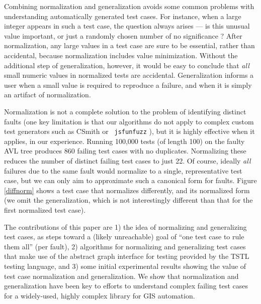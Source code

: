 Combining normalization and generalization avoids some common problems
with understanding automatically generated test cases.  For instance,
when a large integer appears in such a test case, the question always
arises --- is this unusual value important, or just a randomly chosen
number of no significance \cite{MakeMost}?  After normalization, any
large values in a test case are sure to be essential, rather than
accidental, because normalization includes value minimization.
Without the additional step of generalization, however, it would be
easy to conclude that \emph{all} small numeric values in normalized tests are
accidental.  Generalization informs a user when a small value is
required to reproduce a failure, and when it is simply an artifact of normalization.

Normalization is not a complete solution to the problem of
identifying distinct faults (one key limitation is that our algorithms do not apply to
complex custom test generators such as CSmith \cite{csmith} or {\tt
  jsfunfuzz} \cite{jsfunfuzz}), but it is highly effective when it applies,
in our experience.
Running 100,000 tests (of length 100) on the faulty AVL tree produces
860 failing test cases with no duplicates.  Normalizing these reduces
the number of distinct failing test cases to just 22.  Of course,
ideally \emph{all} failures due to the same fault would normalize to a
single, representative test case, but we can only aim to approximate
such a canonical form for faults.  Figure \ref{diffnorm} shows a test
case that normalizes differently, and its normalized form (we omit the
generalization, which is not interestingly different than that for the
first normalized test case).

The contributions of this paper are 1) the idea of normalizing and
generalizing test cases, as steps toward a (likely unreachable) goal
of ``one test case to rule them all'' (per fault), 2) algorithms for normalizing
and generalizing test cases that make use of the abstract graph
interface for testing provided by the TSTL \cite{NFM15,ISSTA15}
testing language, and 3) some initial experimental results showing the
value of test case normalization and generalization.  We show that
normalization and generalization have been key to efforts to understand
complex failing test cases for a widely-used, highly complex library
for GIS automation.

